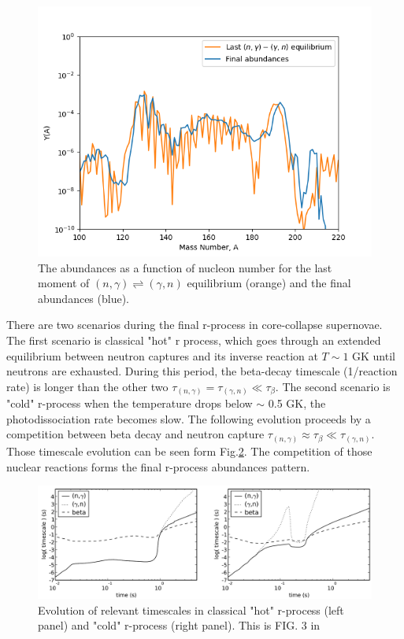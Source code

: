 \documentclass[aps,prl,preprint,groupedaddress]{revtex4}
\begin{document}
\begin{figure}
\centering
\includegraphics[scale=0.6]{ng_final}
\caption{
The abundances as a function of nucleon number for the last moment of $(n, \gamma)\rightleftharpoons (\gamma, n)$ equilibrium (orange) and the final abundances (blue).
}
\label{fig:ng_final}
\end{figure}

There are two scenarios during the final r-process in core-collapse supernovae. The first scenario is classical "hot" r process, which goes through an extended equilibrium between neutron captures and its inverse reaction at $T \sim 1$ GK until neutrons are exhausted. During this period, the beta-decay timescale (1/reaction rate) is longer than the other two $\tau_{(n,\gamma)} = \tau_{(\gamma, n)} \ll \tau_{\beta}$. The second scenario is "cold" r-process when the temperature drops below $\sim$ 0.5 GK, the photodissociation rate becomes slow. The following evolution proceeds by a competition between beta decay and neutron capture $\tau_{(n,\gamma)} \approx \tau_{\beta} \ll \tau_{(\gamma, n)}$\cite{PhysRevC.83.045809}. Those timescale evolution can be seen form Fig.\ref{fig:hot_cold}. The competition of those nuclear reactions forms the final r-process abundances pattern. 

\begin{figure}
\centering
\includegraphics[scale=0.33]{hot_cold.png}
\caption{
Evolution of relevant timescales in classical "hot" r-process (left panel) and "cold" r-process (right panel). This is FIG. 3 in \cite{PhysRevC.83.045809}
}
\label{fig:hot_cold}
\end{figure}
\end{document}
